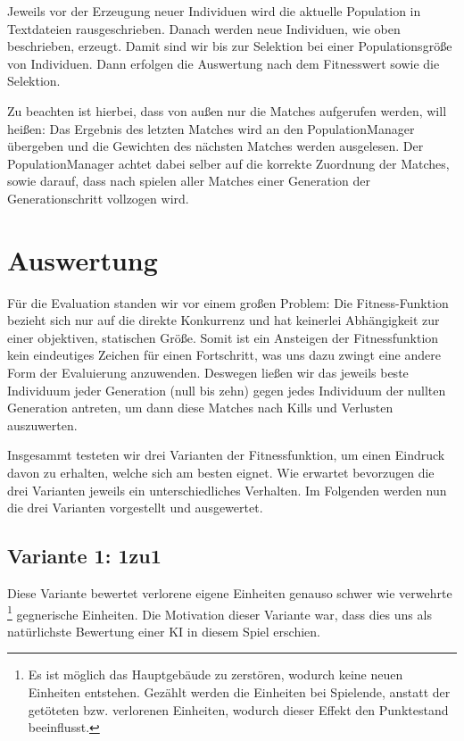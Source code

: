 \documentclass[
	12pt,
	a4paper,
	BCOR10mm,
	DIV14,
	headsepline,
	usegeometry,
]{scrreprt}
\begin{document}
Jeweils vor der Erzeugung neuer Individuen wird die aktuelle Population in Textdateien rausgeschrieben.
Danach werden  neue Individuen, wie oben beschrieben, erzeugt.
Damit sind wir bis zur Selektion bei einer Populationsgröße von  Individuen.
Dann erfolgen die Auswertung nach dem Fitnesswert sowie die Selektion.

Zu beachten ist hierbei, dass von außen nur die Matches aufgerufen werden, will heißen: Das Ergebnis des letzten Matches wird an den PopulationManager übergeben und die Gewichten des nächsten Matches werden ausgelesen.
Der PopulationManager achtet dabei selber auf die korrekte Zuordnung der Matches, sowie darauf, dass nach spielen aller Matches einer Generation der Generationschritt vollzogen wird.

\chapter{Auswertung}
\label{Auswertung}
Für die Evaluation standen wir vor einem großen Problem: Die Fitness-Funktion bezieht sich nur auf die direkte Konkurrenz und hat keinerlei Abhängigkeit zur einer objektiven, statischen Größe.
Somit ist ein Ansteigen der Fitnessfunktion kein eindeutiges Zeichen für einen Fortschritt, was uns dazu zwingt eine andere Form der Evaluierung anzuwenden.
Deswegen ließen wir das jeweils beste Individuum jeder Generation (null bis zehn) gegen jedes Individuum der nullten Generation antreten, um dann diese Matches nach Kills und Verlusten auszuwerten.

Insgesammt testeten wir drei Varianten der Fitnessfunktion, um einen Eindruck davon zu erhalten, welche sich am besten eignet.
Wie erwartet bevorzugen die drei Varianten jeweils ein unterschiedliches Verhalten.
Im Folgenden werden nun die drei Varianten vorgestellt und ausgewertet.

\section{Variante 1: 1zu1}
Diese Variante bewertet verlorene eigene Einheiten genauso schwer wie verwehrte \footnote{Es ist möglich das Hauptgebäude zu zerstören, wodurch keine neuen Einheiten entstehen.
Gezählt werden die Einheiten bei Spielende, anstatt der getöteten bzw. verlorenen Einheiten, wodurch dieser Effekt den Punktestand beeinflusst.} gegnerische Einheiten.
Die Motivation dieser Variante war, dass dies uns als natürlichste Bewertung einer KI in diesem Spiel erschien.
\end{document}
